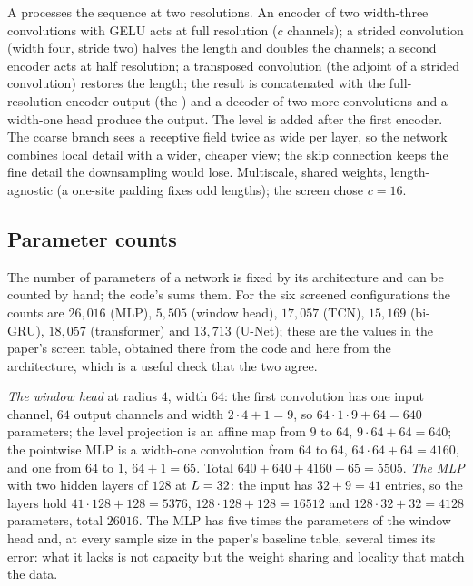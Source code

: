 A  processes the sequence at two resolutions. An encoder of two width-three
convolutions with GELU acts at full resolution ($c$ channels); a strided convolution
(width four, stride two) halves the length and doubles the channels; a second encoder
acts at half resolution; a transposed convolution (the adjoint of a strided
convolution) restores the length; the result is concatenated with the full-resolution
encoder output (the ) and a decoder of two more convolutions and a
width-one head produce the output. The level is added after the first encoder. The
coarse branch sees a receptive field twice as wide per layer, so the network combines
local detail with a wider, cheaper view; the skip connection keeps the fine detail the
downsampling would lose. Multiscale, shared weights, length-agnostic (a one-site
padding fixes odd lengths); the screen chose $c=16$.

\subsection{Parameter counts}

The number of parameters of a network is fixed by its architecture and can be counted
by hand; the code's  sums them. For the six screened configurations the
counts are $26{,}016$ (MLP), $5{,}505$ (window head), $17{,}057$ (TCN), $15{,}169$ (bi-GRU),
$18{,}057$ (transformer) and $13{,}713$ (U-Net); these are the values in the paper's screen
table, obtained there from the code and here from the architecture, which is a useful
check that the two agree.

\begin{example}
\label{ex:params}
\emph{The window head} at radius $4$, width $64$: the first convolution has one input
channel, $64$ output channels and width $2\cdot4+1=9$, so $64\cdot1\cdot9+64=640$
parameters; the level projection is an affine map from $9$ to $64$, $9\cdot64+64=640$;
the pointwise MLP is a width-one convolution from $64$ to $64$, $64\cdot64+64=4160$, and
one from $64$ to $1$, $64+1=65$. Total $640+640+4160+65=5505$. \emph{The MLP} with two
hidden layers of $128$ at $L=32$: the input has $32+9=41$ entries, so the layers hold
$41\cdot128+128=5376$, $128\cdot128+128=16512$ and $128\cdot32+32=4128$ parameters,
total $26016$. The MLP has five times the parameters of the window head and, at every
sample size in the paper's baseline table, several times its error: what it lacks is
not capacity but the weight sharing and locality that match the data.
\end{example}

